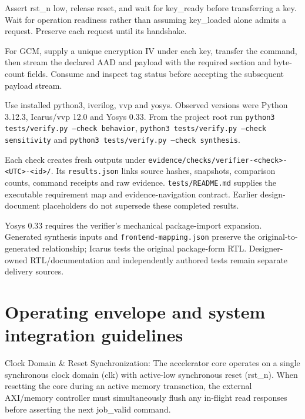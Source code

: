 \documentclass[11pt,a4paper]{article}
\begin{document}
Assert rst\_\allowbreak{}n low,\allowbreak{} release reset,\allowbreak{} and wait for key\_\allowbreak{}ready before transferring a key. Wait for operation readiness rather than assuming key\_\allowbreak{}loaded alone admits a request. Preserve each request until its handshake.


For GCM,\allowbreak{} supply a unique encryption IV under each key,\allowbreak{} transfer the command,\allowbreak{} then stream the declared AAD and payload with the required section and byte-count fields. Consume and inspect tag status before accepting the subsequent payload stream.


Use installed python3,\allowbreak{} iverilog,\allowbreak{} vvp and yosys. Observed versions were Python 3.12.3,\allowbreak{} Icarus/\allowbreak{}vvp 12.0 and Yosys 0.33. From the project root run \texttt{python3 tests/\allowbreak{}verify.py --check behavior},\allowbreak{} \texttt{python3 tests/\allowbreak{}verify.py --check sensitivity} and \texttt{python3 tests/\allowbreak{}verify.py --check synthesis}.


Each check creates fresh outputs under \texttt{evidence/\allowbreak{}checks/\allowbreak{}verifier-<check>-<UTC>-<id>/\allowbreak{}}. Its \texttt{results.json} links source hashes,\allowbreak{} snapshots,\allowbreak{} comparison counts,\allowbreak{} command receipts and raw evidence. \texttt{tests/\allowbreak{}README.md} supplies the executable requirement map and evidence-navigation contract. Earlier design-document placeholders do not supersede these completed results.


Yosys 0.33 requires the verifier's mechanical package-import expansion. Generated synthesis inputs and \texttt{frontend-mapping.json} preserve the original-to-generated relationship; Icarus tests the original package-form RTL. Designer-owned RTL/\allowbreak{}documentation and independently authored tests remain separate delivery sources.


\section{Operating envelope and system integration guidelines}

Clock Domain \& Reset Synchronization: The accelerator core operates on a single synchronous clock domain (\allowbreak{}clk)\allowbreak{} with active-low synchronous reset (\allowbreak{}rst\_\allowbreak{}n)\allowbreak{}. When resetting the core during an active memory transaction,\allowbreak{} the external AXI/\allowbreak{}memory controller must simultaneously flush any in-flight read responses before asserting the next job\_\allowbreak{}valid command.
\end{document}
